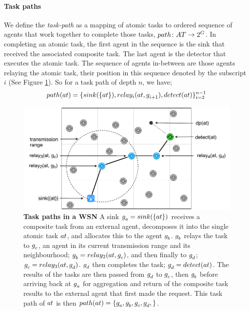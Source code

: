 
\paragraph{Task paths}
We define the \textit{task-path} as a mapping of atomic tasks to ordered sequence of agents that work together to complete those tasks, $\formalTaskArc{}{}$. In completing an atomic task, the first agent in the sequence is the sink that received the associated composite task. The last agent is the detector that executes the atomic task. The sequence of agents in-between are those agents relaying the atomic task, their position in this sequence denoted by the subscript $i$ (See Figure \ref{fig:grid_concept}). So for a task path of depth $n$, we have;
\begin{equation}
	\functionTaskArc{}{} = \lbrace \functionSinkRoleAtomic{}{}, \functionRelayRole{i}{}{i+1}, \functionDetectorRole{}{} \rbrace_{i=2}^{n-1}
\end{equation}
\begin{figure}
	\centering 
	\includegraphics[width=0.75\linewidth, trim={25pt 0pt 24pt 0pt, clip}]{grid_concept}
	\caption[Task paths in a WSN]{\textbf{Task paths in a WSN} A sink $\varAgent{a}{} = \functionSinkRoleAtomic{}{}$ receives a composite task from an external agent, decomposes it into the single atomic task $\varAtomicTask{}{}$, and allocates this to the agent $g_{b}^{}$. $g_{b}^{}$ relays the task to $g_{c}^{}$, an agent in its current transmission range and its neighbourhood;  $\varAgent{b}{} = \functionRelayRole{2}{}{c}$, and then finally to $g_{d}^{}$; $\varAgent{c}{} = \functionRelayRole{3}{}{d}$. $g_{d}^{}$ then  completes the task; $\varAgent{d}{} = \functionDetectorRole{}{}$. The results of the tasks are then passed from $g_{d}^{}$ to  $g_{c}^{}$, then $g_{b}^{}$ before arriving back at $g_{a}^{}$ for aggregation and return of the composite task results to the external agent that first made the request. This task path of $\varAtomicTask{}{}$ is then $\functionTaskArc{}{} = \lbrace \varAgent{a}{}, \varAgent{b}{}, \varAgent{c}{}, \varAgent{d}{}, \rbrace$.
	}
	\label{fig:grid_concept}
\end{figure}
